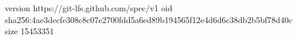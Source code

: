 version https://git-lfs.github.com/spec/v1
oid sha256:4ae3decfe308c8c07e2700fdd5a6ed89b194565f12e4d6d6c38db2b5bf78d40c
size 15453351
